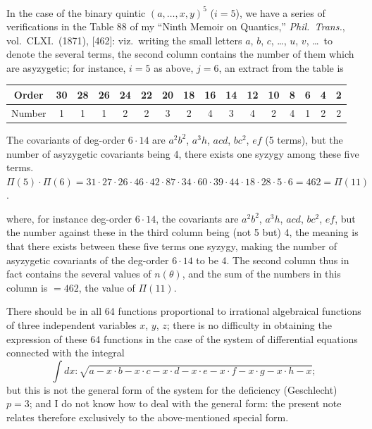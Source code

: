\documentclass[11pt,a4paper]{book}
\providecommand{\between}{,}
\begin{document}
In the case of the binary quintic $(a, \dots \between x, y)^5$ ($i = 5$), we have a series of verifications in the Table 88 of my ``Ninth Memoir on Quantics,'' \textit{Phil.\ Trans.}, vol.\ CLXI.\ (1871), [462]: viz.\ writing the small letters $a$, $b$, $c$, \dots, $u$, $v$, \dots\ to denote the several terms, the second column contains the number of them which are asyzygetic; for instance, $i = 5$ as above, $j = 6$, an extract from the table is
\begin{center}
\begin{tabular}{c|ccccccccccccccc}
Order & 30 & 28 & 26 & 24 & 22 & 20 & 18 & 16 & 14 & 12 & 10 & 8 & 6 & 4 & 2 \\
\hline
Number & 1 & 1 & 1 & 2 & 2 & 3 & 2 & 4 & 3 & 4 & 2 & 4 & 1 & 2 & 2 \\
\hline
\end{tabular}
\end{center}
The covariants of deg-order $6 \cdot 14$ are $a^2b^2$, $a^3h$, $acd$, $bc^2$, $ef$ (5 terms), but the number of asyzygetic covariants being 4, there exists one syzygy among these five terms.
$\Pi(5) \cdot \Pi(6) = 31 \cdot 27 \cdot 26 \cdot 46 \cdot 42 \cdot 87 \cdot 34 \cdot 60 \cdot 39 \cdot 44 \cdot 18 \cdot 28 \cdot 5 \cdot 6 = 462 = \Pi(11)$.

\clearpage
where, for instance deg-order $6 \cdot 14$, the covariants are $a^2b^2$, $a^3h$, $acd$, $bc^2$, $ef$, but the number against these in the third column being (not 5 but) 4, the meaning is that there exists between these five terms one syzygy, making the number of asyzygetic covariants of the deg-order $6 \cdot 14$ to be 4. The second column thus in fact contains the several values of $n(\theta)$, and the sum of the numbers in this column is $= 462$, the value of $\Pi(11)$.

\clearpage

There should be in all 64 functions proportional to irrational algebraical functions of three independent variables $x$, $y$, $z$; there is no difficulty in obtaining the expression of these 64 functions in the case of the system of differential equations connected with the integral
\[
\int dx : \sqrt{a - x \cdot b - x \cdot c - x \cdot d - x \cdot e - x \cdot f - x \cdot g - x \cdot h - x};
\]
but this is not the general form of the system for the deficiency (Geschlecht) $p = 3$; and I do not know how to deal with the general form: the present note relates therefore exclusively to the above-mentioned special form.
\end{document}
